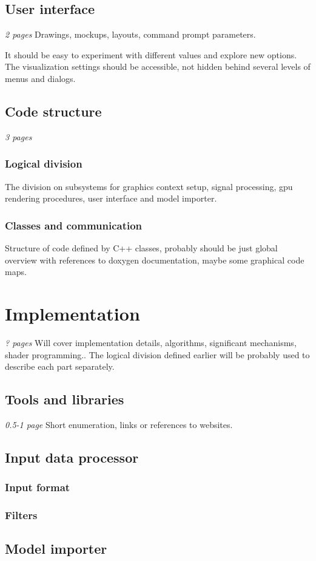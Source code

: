 \section{User interface}
\emph{2 pages}
Drawings, mockups, layouts, command prompt parameters.

It should be easy to experiment with different values and explore new options.
The visualization settings should be accessible, not hidden behind several
levels of menus and dialogs.
\section{Code structure}
\emph{3 pages}
\subsection{Logical division}
The division on subsystems for graphics context setup, signal processing, gpu
rendering procedures, user interface and model importer.
\subsection{Classes and communication}
Structure of code defined by C++ classes, probably should be just global
overview with references to doxygen documentation, maybe some graphical code
maps.
\chapter{Implementation}
\emph{? pages}
Will cover implementation details, algorithms, significant mechanisms, shader
programming.. The logical division defined earlier will be probably used to
describe each part separately.
\section{Tools and libraries}
\emph{0.5-1 page}
Short enumeration, links or references to websites.
\section{Input data processor}
\subsection{Input format}
\subsection{Filters}
\section{Model importer}
